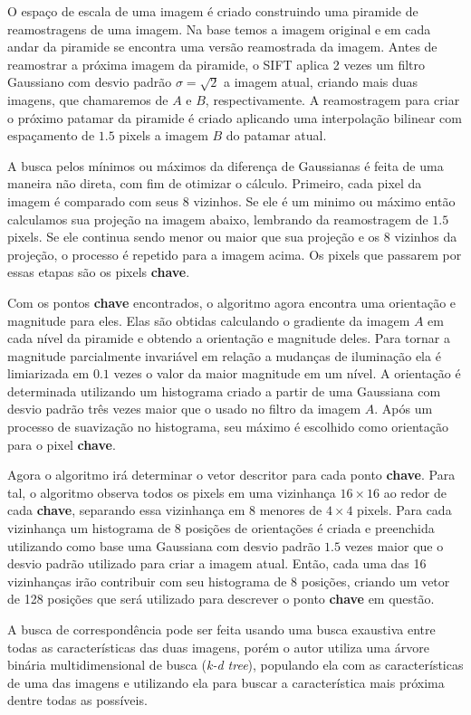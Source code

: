   O espaço de escala de uma imagem é criado construindo uma piramide de reamostragens de uma imagem. Na base temos a
imagem original e em cada andar da piramide se encontra uma versão reamostrada da imagem. Antes de reamostrar a próxima
imagem da piramide, o SIFT aplica 2 vezes um filtro Gaussiano com desvio padrão $\sigma = \sqrt{2}$ a imagem atual,
criando mais duas imagens, que chamaremos de $A$ e $B$, respectivamente. A reamostragem para criar o próximo patamar da
piramide é criado aplicando uma interpolação bilinear com espaçamento de $1.5$ pixels a imagem $B$ do patamar atual.

  A busca pelos mínimos ou máximos da diferença de Gaussianas é feita de uma maneira não direta, com fim de otimizar
o cálculo. Primeiro, cada pixel da imagem é comparado com seus 8 vizinhos. Se ele é um minimo ou máximo então calculamos
sua projeção na imagem abaixo, lembrando da reamostragem de $1.5$ pixels. Se ele continua sendo menor ou maior que sua
projeção e os 8 vizinhos da projeção, o processo é repetido para a imagem acima. Os pixels que passarem por essas
etapas são os pixels \textbf{chave}.

  Com os pontos \textbf{chave} encontrados, o algoritmo agora encontra uma orientação e magnitude para eles. Elas são
obtidas calculando o gradiente da imagem $A$ em cada nível da piramide e obtendo a orientação e magnitude deles. Para
tornar a magnitude parcialmente invariável em relação a mudanças de iluminação ela é limiarizada em $0.1$ vezes o valor
da maior magnitude em um nível. A orientação é determinada utilizando um histograma criado a partir de uma Gaussiana
com desvio padrão três vezes maior que o usado no filtro da imagem $A$. Após um processo de suavização no histograma,
seu máximo é escolhido como orientação para o pixel \textbf{chave}.

  Agora o algoritmo irá determinar o vetor descritor para cada ponto \textbf{chave}. Para tal, o algoritmo observa todos
os pixels em uma vizinhança $16 \times 16$ ao redor de cada \textbf{chave}, separando essa vizinhança em 8 menores de $4 \times 4$ pixels.
Para cada vizinhança um histograma de 8 posições de orientações é criada e preenchida utilizando como base uma Gaussiana
com desvio padrão $1.5$ vezes maior que o desvio padrão utilizado para criar a imagem atual. Então, cada uma das 16
vizinhanças irão contribuir com seu histograma de 8 posições, criando um vetor de 128 posições que será utilizado
para descrever o ponto \textbf{chave} em questão.

  A busca de correspondência pode ser feita usando uma busca exaustiva entre todas as características das duas imagens,
porém o autor utiliza uma árvore binária multidimensional de busca (\textit{k-d tree}), populando ela com as
características de uma das imagens e utilizando ela para buscar a característica mais próxima dentre todas as possíveis.

